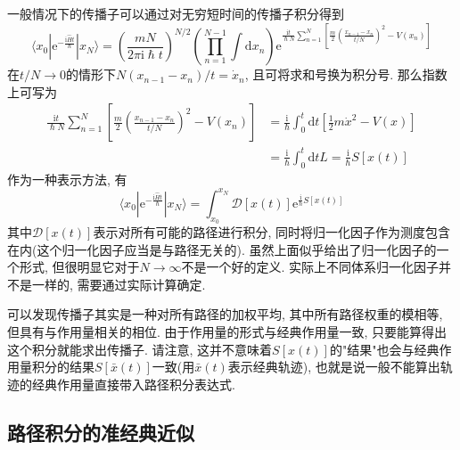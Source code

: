         \splitline

        一般情况下的传播子可以通过对无穷短时间的传播子积分得到
        \begin{equation}
            \langle x_0 | \mathrm{e}^{-\frac {\mathrm{i}\hat{H}t}{\hslash}} | x_N \rangle = \left(\frac{mN}{2\pi\mathrm{i}\hslash t}\right)^{N/2} \left(\prod_{n = 1}^{N-1}\int 
            \mathrm{d} x_n \right) \mathrm{e}^{ \frac{\mathrm{i}t}{\hslash N} \sum_{n = 1}^{N} \left[ \frac{m}{2} \left(\frac{x_{n-1} - x_n}{t/N}\right)^2 - V(x_n)\right] }
        \end{equation}
        在$t/N \to 0$的情形下$N(x_{n-1} - x_n)/t = \dot x_n$, 且可将求和号换为积分号. 那么指数上可写为
        \begin{equation}\begin{aligned}
            \frac{\mathrm{i}t}{\hslash N} \sum_{n = 1}^{N} \left[ \frac{m}{2} \left(\frac{x_{n-1} - x_n}{t/N}\right)^2 - V(x_n)\right] &= \frac{\mathrm{i}}{\hslash} \int_0^t \mathrm{d}t \left[ \frac{1}{2} m \dot x^2 - V(x) \right]\\
            &= \frac{\mathrm{i}}{\hslash} \int_0^t \mathrm{d}t L = \frac{\mathrm{i}}{\hslash} S[x(t)]
        \end{aligned}\end{equation}
        作为一种表示方法, 有\cite{费曼量子力学与路径积分}
        \begin{equation}\label{eq:8-2-1}
            \langle x_0 | \mathrm{e}^{-\frac {\mathrm{i}\hat{H}t}{\hslash}} | x_N \rangle = \int_{x_0}^{x_N} \mathcal{D}[x(t)] \mathrm{e}^{ \frac{\mathrm{i}}{\hslash} S[x(t)] }
        \end{equation}
        其中$\mathcal{D}[x(t)]$表示对所有可能的路径进行积分, 同时将归一化因子作为测度包含在内(这个归一化因子应当是与路径无关的). 虽然上面似乎给出了归一化因子的一个形式, 但很明显它对于$N \to \infty$不是一个好的定义. 实际上不同体系归一化因子并不是一样的, 需要通过实际计算确定. 

        可以发现传播子其实是一种对所有路径的加权平均, 其中所有路径权重的模相等, 但具有与作用量相关的相位. 由于作用量的形式与经典作用量一致, 只要能算得出这个积分就能求出传播子. 请注意, 这并不意味着$S[x(t)]$的"结果"也会与经典作用量积分的结果$S[\bar x(t)]$一致(用$\bar x(t)$表示经典轨迹), 也就是说一般不能算出轨迹的经典作用量直接带入路径积分表达式.

        \subsection{路径积分的准经典近似}

